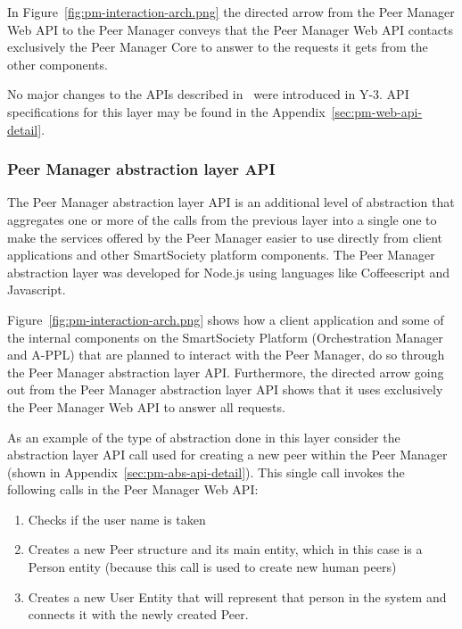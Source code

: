 In Figure~\ref{fig:pm-interaction-arch.png} the directed arrow from the Peer Manager Web API to the Peer Manager conveys that the Peer Manager Web API contacts exclusively the Peer Manager Core to answer to the requests it gets from the other components.

No major changes to the APIs described in~\cite{D4.2} were introduced in Y-3. API specifications for this layer may be found in the Appendix~\ref{sec:pm-web-api-detail}.

\subsubsection{Peer Manager abstraction layer API} \label{ssec:pm-abs-api}
The Peer Manager abstraction layer API is an additional level of abstraction that aggregates one or more of the calls from the previous layer into a single one to make the services offered by the Peer Manager easier to use directly from client applications and other SmartSociety platform components. The Peer Manager abstraction layer was developed for Node.js using languages like Coffeescript and Javascript. 

Figure~\ref{fig:pm-interaction-arch.png} shows how a client application and some of the internal components on the SmartSociety Platform (Orchestration Manager and A-PPL) that are planned to interact with the Peer Manager, do so through the Peer Manager abstraction layer API. Furthermore, the directed arrow going out from the Peer Manager abstraction layer API shows that it uses exclusively the Peer Manager Web API to answer all requests.

As an example of the type of abstraction done in this layer consider the abstraction layer API call used for creating a new peer within the Peer Manager (shown in Appendix~\ref{sec:pm-abs-api-detail}). This single call invokes the following calls in the Peer Manager Web API:
\begin{enumerate}
	\item Checks if the user name is taken
	\item Creates a new Peer structure and its main entity, which in this case is a Person entity (because this call is used to create new human peers)
	\item Creates a new User Entity that will represent that person in the system and connects it with the newly created Peer.
\end{enumerate}


